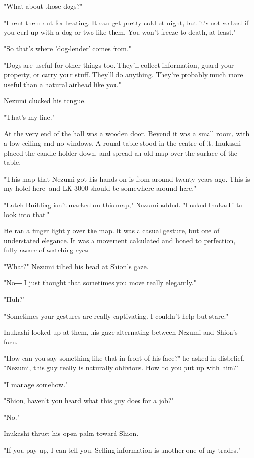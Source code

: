 "What about those dogs?"

"I rent them out for heating. It can get pretty cold at night, but it's
not so bad if you curl up with a dog or two like them. You won't freeze
to death, at least."

"So that's where 'dog-lender' comes from."

"Dogs are useful for other things too. They'll collect information,
guard your property, or carry your stuff. They'll do anything. They're
probably much more useful than a natural airhead like you."

Nezumi clucked his tongue.

"That's my line."

At the very end of the hall was a wooden door. Beyond it was a small
room, with a low ceiling and no windows. A round table stood in the
centre of it. Inukashi placed the candle holder down, and spread an old
map over the surface of the table.

"This map that Nezumi got his hands on is from around twenty years ago.
This is my hotel here, and LK-3000 should be somewhere around here."

"Latch Building isn't marked on this map," Nezumi added. "I asked
Inukashi to look into that."

He ran a finger lightly over the map. It was a casual gesture, but one
of understated elegance. It was a movement calculated and honed to
perfection, fully aware of watching eyes.

"What?" Nezumi tilted his head at Shion's gaze.

"No― I just thought that sometimes you move really elegantly."

"Huh?"

"Sometimes your gestures are really captivating. I couldn't help but
stare."

Inukashi looked up at them, his gaze alternating between Nezumi and
Shion's face.

"How can you say something like that in front of his face?" he asked in
disbelief. "Nezumi, this guy really is naturally oblivious. How do you
put up with him?"

"I manage somehow."

"Shion, haven't you heard what this guy does for a job?"

"No."

Inukashi thrust his open palm toward Shion.

"If you pay up, I can tell you. Selling information is another one of my
trades."

